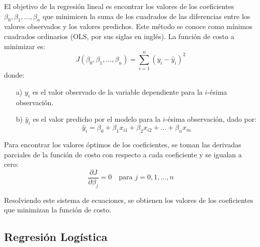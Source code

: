 \documentclass[a4paper]{report} %
\begin{document}
El objetivo de la regresi\'on lineal es encontrar los valores de los coeficientes $\beta_0, \beta_1, \ldots, \beta_n$ que minimicen la suma de los cuadrados de las diferencias entre los valores observados y los valores predichos. Este m\'etodo se conoce como m\'inimos cuadrados ordinarios (OLS, por sus siglas en ingl\'es). La funci\'on de costo a minimizar es:
\begin{equation}
J\left(\beta_0, \beta_1, \ldots, \beta_n\right) = \sum_{i=1}^{n}\left(y_i - \hat{y}_i\right)^2
\end{equation}
donde:
\begin{itemize}
    \item[a) ] $y_i$ es el valor observado de la variable dependiente para la $i$-\'esima observaci\'on.
    \item[b) ] $\hat{y}_i$ es el valor predicho por el modelo para la $i$-\'esima observaci\'on, dado por:
    \begin{equation}
    \hat{y}_i = \beta_0 + \beta_1 x_{i1} + \beta_2 x_{i2} + \ldots + \beta_n x_{in}
    \end{equation}
\end{itemize}

Para encontrar los valores \'optimos de los coeficientes, se toman las derivadas parciales de la funci\'on de costo con respecto a cada coeficiente y se igualan a cero:
\begin{equation}
\frac{\partial J}{\partial \beta_j} = 0 \quad \text{para } j = 0, 1, \ldots, n
\end{equation}

Resolviendo este sistema de ecuaciones, se obtienen los valores de los coeficientes que minimizan la funci\'on de costo.
\subsection{Regresi\'on Log\'istica}
\end{document}
